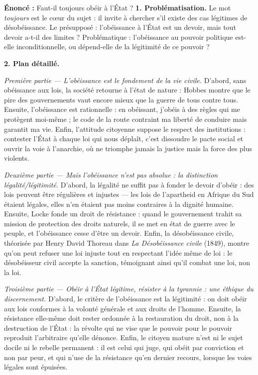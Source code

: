 \documentclass[11pt]{article}
\newcommand{\cle}[1]{{\popxbold\color{popdark}#1}}
\begin{document}
\begin{exoresolu}
\textbf{Énoncé :} Faut-il toujours obéir à l'État ?
\tcblower
\textbf{1. Problématisation.} Le mot \emph{toujours} est le cœur du sujet : il invite à chercher s'il existe des cas légitimes de désobéissance. Le présupposé : l'obéissance à l'État est un devoir, mais tout devoir a-t-il des limites ? Problématique : l'obéissance au pouvoir politique est-elle inconditionnelle, ou dépend-elle de la \cle{légitimité} de ce pouvoir ?

\textbf{2. Plan détaillé.}

\emph{Première partie — L'obéissance est le fondement de la vie civile.} D'abord, sans obéissance aux lois, la société retourne à l'état de nature : Hobbes montre que le pire des gouvernements vaut encore mieux que la guerre de tous contre tous. Ensuite, l'obéissance est rationnelle : en obéissant, j'obéis à des règles qui me protègent moi-même ; le code de la route contraint ma liberté de conduire mais garantit ma vie. Enfin, l'attitude citoyenne suppose le respect des institutions : contester l'État à chaque loi qui nous déplaît, c'est dissoudre le pacte social et ouvrir la voie à l'anarchie, où ne triomphe jamais la justice mais la force des plus violents.

\emph{Deuxième partie — Mais l'obéissance n'est pas absolue : la distinction légalité/légitimité.} D'abord, la légalité ne suffit pas à fonder le devoir d'obéir : des lois peuvent être régulières et injustes — les lois de l'apartheid en Afrique du Sud étaient légales, elles n'en étaient pas moins contraires à la dignité humaine. Ensuite, Locke fonde un \cle{droit de résistance} : quand le gouvernement trahit sa mission de protection des droits naturels, il se met en état de guerre avec le peuple, et l'obéissance cesse d'être un devoir. Enfin, la \cle{désobéissance civile}, théorisée par Henry David Thoreau dans \emph{La Désobéissance civile} (1849), montre qu'on peut refuser une loi injuste tout en respectant l'idée même de loi : le désobéisseur civil accepte la sanction, témoignant ainsi qu'il combat une loi, non la loi.

\emph{Troisième partie — Obéir à l'État légitime, résister à la tyrannie : une éthique du discernement.} D'abord, le critère de l'obéissance est la légitimité : on doit obéir aux lois conformes à la volonté générale et aux droits de l'homme. Ensuite, la résistance elle-même doit rester ordonnée à la restauration du droit, non à la destruction de l'État : la révolte qui ne vise que le pouvoir pour le pouvoir reproduit l'arbitraire qu'elle dénonce. Enfin, le citoyen mature n'est ni le sujet docile ni le rebelle permanent : il est celui qui juge, qui obéit par conviction et non par peur, et qui n'use de la résistance qu'en dernier recours, lorsque les voies légales sont épuisées.


\end{exoresolu}
\end{document}
